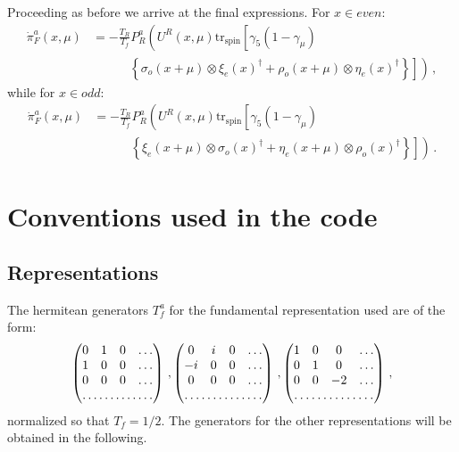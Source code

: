 \documentclass{article}[12pt]
\begin{document}
Proceeding as before we arrive at the final expressions. For $x\in even$:
\begin{align}
\dot\pi^a_F(x,\mu) &= - \frac{T_R}{T_f} P^a_R \left( U^R(x,\mu) \mathrm{tr_{spin}} \left[ \gamma_5 (1-\gamma_\mu) \right. \right. \nonumber\\
										&\quad\quad\quad	\left. \left. \left\{  \sigma_o(x+\mu)\otimes\xi_e(x)^\dagger + \rho_o(x+\mu)\otimes\eta_e(x)^\dagger \right\} \right] \right)\, ,
\end{align}
while for $x\in odd$:
\begin{align}
\dot\pi^a_F(x,\mu) &= - \frac{T_R}{T_f} P^a_R \left( U^R(x,\mu) \mathrm{tr_{spin}} \left[ \gamma_5 (1-\gamma_\mu) \right. \right. \nonumber\\
										&\quad\quad\quad	\left. \left. \left\{\xi_e(x+\mu)\otimes\sigma_o(x)^\dagger + \eta_e(x+\mu)\otimes\rho_o(x)^\dagger   \right\} \right] \right)\, .
\end{align}




\section{Conventions used in the code}

\subsection{Representations}

The hermitean generators $T^a_f$ for the fundamental representation used are of the form:
\begin{equation}
\begin{pmatrix} 
0&1&0&\dots\\
1&0&0&\dots\\
0&0&0&\dots\\
\hdotsfor{4}
\end{pmatrix}\, ,
\begin{pmatrix} 
0&i&0&\dots\\
-i&0&0&\dots\\
0&0&0&\dots\\
\hdotsfor{4}
\end{pmatrix}\, ,
\begin{pmatrix} 
1&0&0&\dots\\
0&1&0&\dots\\
0&0&-2&\dots\\
\hdotsfor{4}
\end{pmatrix}\, ,
\end{equation}
normalized so that $T_f=1/2$. The generators for the other representations 
will be obtained in the following.
\end{document}
